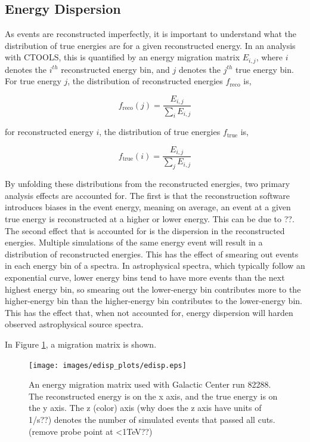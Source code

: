   \subsection{Energy Dispersion}\label{subsec:edisp}
    As events are reconstructed imperfectly, it is important to understand what the distribution of true energies are for a given reconstructed energy.
    In an analysis with CTOOLS, this is quantified by an energy migration matrix $E_{i,j}$, where $i$ denotes the $i^{th}$ reconstructed energy bin, and $j$ denotes the $j^{th}$ true energy bin.
    For true energy $j$, the distribution of reconstructed energies $f_{\text{reco}}$ is,

    \begin{equation}
      \label{eqn:edispreco}
      f_{\text{reco}}(j)=\frac{E_{i,j}}{ \sum_{i}E_{i,j} }
    \end{equation}

    for reconstructed energy $i$, the distribution of true energies $f_{\text{true}}$ is,

    \begin{equation}
      \label{eqn:edisptrue}
      f_{\text{true}}(i)=\frac{E_{i,j}}{ \sum_{j}E_{i,j} }
    \end{equation}

    By unfolding these distributions from the reconstructed energies, two primary analysis effects are accounted for.
    The first is that the reconstruction software introduces biases in the event energy, meaning on average, an event at a given true energy is reconstructed at a higher or lower energy.
    This can be due to ??.
    The second effect that is accounted for is the dispersion in the reconstructed energies.
    Multiple simulations of the same energy event will result in a distribution of reconstructed energies.
    This has the effect of smearing out events in each energy bin of a spectra.
    In astrophysical spectra, which typically follow an exponential curve, lower energy bins tend to have more events than the next highest energy bin, so smearing out the lower-energy bin contributes more to the higher-energy bin than the higher-energy bin contributes to the lower-energy bin.
    This has the effect that, when not accounted for, energy dispersion will harden observed astrophysical source spectra.

    In Figure \ref{fig:migmatrix}, a migration matrix is shown.

    \begin{figure}[ht]
      \begin{center}
        \texttt{[image: images/edisp\_plots/edisp.eps]}
        \caption[Energy Migration Matrix]{An energy migration matrix used with Galactic Center run 82288.  The reconstructed energy is on the x axis, and the true energy is on the y axis.  The z (color) axis (why does the z axis have units of 1/s??) denotes the number of simulated events that passed all cuts. (remove probe point at <1TeV??)}\label{fig:migmatrix}
      \end{center}
    \end{figure}

